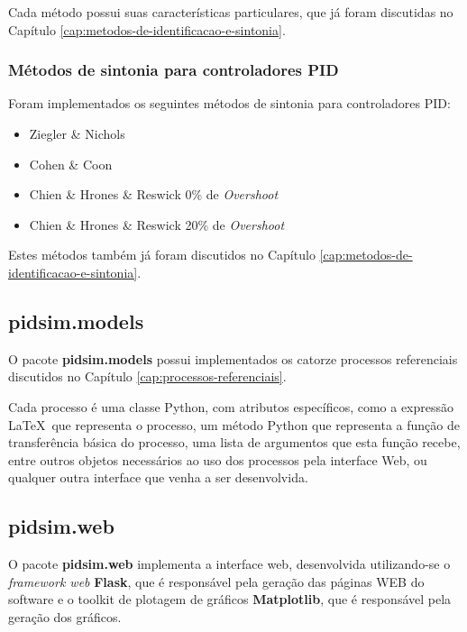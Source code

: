             Cada método possui suas características particulares, que já foram discutidas no Capítulo
            \ref{cap:metodos-de-identificacao-e-sintonia}.

        \subsubsection{Métodos de sintonia para controladores \acs{PID}}
            
            Foram implementados os seguintes métodos de sintonia para controladores \acs{PID}:

            \begin{itemize}
                \item Ziegler \& Nichols
                \item Cohen \& Coon
                \item Chien \& Hrones \& Reswick 0\% de \textit{Overshoot}
                \item Chien \& Hrones \& Reswick 20\% de \textit{Overshoot}
            \end{itemize}

            Estes métodos também já foram discutidos no Capítulo
            \ref{cap:metodos-de-identificacao-e-sintonia}.

        \subsection{pidsim.models}
            
            O pacote \textbf{pidsim.models} possui implementados os catorze processos referenciais
            discutidos no Capítulo \ref{cap:processos-referenciais}.

            Cada processo é uma classe Python, com atributos específicos, como a expressão \LaTeX\ 
	    que representa o processo, um método Python que representa a função de
            transferência básica do processo, uma lista de argumentos que esta função recebe,
            entre outros objetos necessários ao uso dos processos pela interface Web, ou qualquer
            outra interface que venha a ser desenvolvida.

        \subsection{pidsim.web}
            
            O pacote \textbf{pidsim.web} implementa a interface web, desenvolvida utilizando-se
            o \textit{framework web} \textbf{Flask}, que é responsável pela geração das páginas
            WEB do software e o toolkit de plotagem de gráficos \textbf{Matplotlib}, que é
            responsável pela geração dos gráficos.

